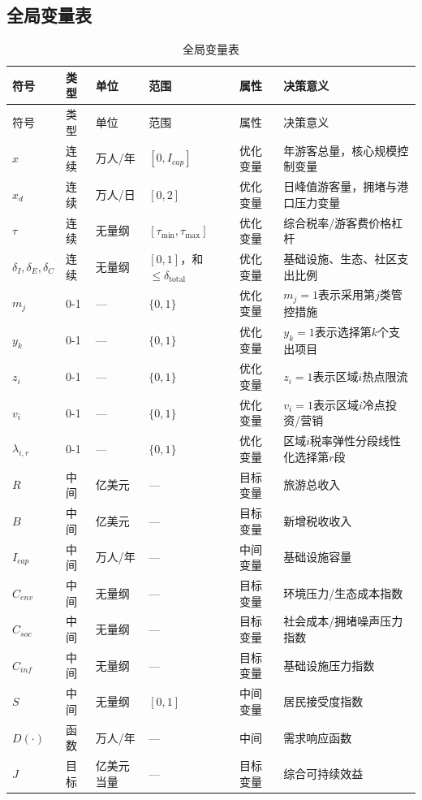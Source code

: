 \documentclass[UTF8,a4paper,12pt]{ctexart}
\begin{document}
\subsection{全局变量表}

\begin{longtable}{@{}p{1.5cm}p{1.4cm}p{1.2cm}p{2.1cm}p{1.2cm}p{5.0cm}@{}}
\caption{全局变量表}\\
\toprule
符号 & 类型 & 单位 & 范围 & 属性 & 决策意义\\
\midrule
\endfirsthead
\toprule
符号 & 类型 & 单位 & 范围 & 属性 & 决策意义\\
\midrule
\endhead
\(x\) & 连续 & 万人/年 & \([0,I_{cap}]\) & 优化变量 & 年游客总量，核心规模控制变量\\
\(x_d\) & 连续 & 万人/日 & \([0,2]\) & 优化变量 & 日峰值游客量，拥堵与港口压力变量\\
\(\tau\) & 连续 & 无量纲 & \([\tau_{\min},\tau_{\max}]\) & 优化变量 & 综合税率/游客费价格杠杆\\
\(\delta_I,\delta_E,\delta_C\) & 连续 & 无量纲 & \([0,1]\)，和\(\le\delta_{\mathrm{total}}\) & 优化变量 & 基础设施、生态、社区支出比例\\
\(m_j\) & 0-1 & — & \(\{0,1\}\) & 优化变量 & \(m_j=1\)表示采用第\(j\)类管控措施\\
\(y_k\) & 0-1 & — & \(\{0,1\}\) & 优化变量 & \(y_k=1\)表示选择第\(k\)个支出项目\\
\(z_i\) & 0-1 & — & \(\{0,1\}\) & 优化变量 & \(z_i=1\)表示区域\(i\)热点限流\\
\(v_i\) & 0-1 & — & \(\{0,1\}\) & 优化变量 & \(v_i=1\)表示区域\(i\)冷点投资/营销\\
\(\lambda_{i,r}\) & 0-1 & — & \(\{0,1\}\) & 优化变量 & 区域\(i\)税率弹性分段线性化选择第\(r\)段\\
\(R\) & 中间 & 亿美元 & — & 目标变量 & 旅游总收入\\
\(B\) & 中间 & 亿美元 & — & 目标变量 & 新增税收收入\\
\(I_{cap}\) & 中间 & 万人/年 & — & 中间变量 & 基础设施容量\\
\(C_{env}\) & 中间 & 无量纲 & — & 目标变量 & 环境压力/生态成本指数\\
\(C_{soc}\) & 中间 & 无量纲 & — & 目标变量 & 社会成本/拥堵噪声压力指数\\
\(C_{inf}\) & 中间 & 无量纲 & — & 目标变量 & 基础设施压力指数\\
\(S\) & 中间 & 无量纲 & \([0,1]\) & 中间变量 & 居民接受度指数\\
\(D(\cdot)\) & 函数 & 万人/年 & — & 中间 & 需求响应函数\\
\(J\) & 目标 & 亿美元当量 & — & 目标变量 & 综合可持续效益\\
\bottomrule
\end{longtable}
\end{document}

